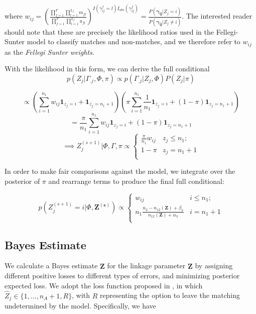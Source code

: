 \documentclass[12pt,letterpaper]{article}
\newcommand{\1}[1]{\mathbb{I}\!\left[#1\right]} %
\begin{document}
where
$w_{ij} = \left(\frac{\prod_{f=1}^{F}\prod_{l=1}^{L_f} m_{fl}}{\prod_{f=1}^{F}\prod_{l=1}^{L_f} u_{fl}}\right)^{I(\gamma_{ij}^f = l)I_{obs}(\gamma_{ij}^f)} = \frac{P(\boldsymbol{\gamma_{ij}}|Z_j = i)}{P(\boldsymbol{\gamma_{ij}} |Z_j \neq i)}$.
The interested reader should note that these are precisely the
likelihood ratios used in the Fellegi-Sunter model to classify matches
and non-matches, and we therefore refer to \(w_{ij}\) as the
\emph{Fellegi Sunter weights}.

With the likelihood in this form, we can derive the full conditional
\[p(Z_j|\Gamma_{.j}, \Phi, \pi) \propto p(\Gamma_{.j}| Z_j, \Phi) P(Z_j|\pi)\]

\[\propto \left(\sum_{i=1}^{n_1}w_{ij}\bm{1}_{z_j = i} + \bm{1}_{z_j = n_1 + 1}\right)\left(\pi\sum_{i=1}^{n_1}\frac{1}{n_1}\bm{1}_{z_j = i} + (1-\pi)\bm{1}_{z_j = n_1 + 1}\right)\]
\[= \frac{\pi}{n_1}\sum_{i=1}^{n_1}w_{ij}\bm{1}_{z_j = i} + (1-\pi)\bm{1}_{z_j = n_1 + 1} \]
\[ \implies Z_j^{(s+1)} | \Phi, \Gamma, \pi \propto
\begin{cases} 
	\frac{\pi}{n_1}w_{ij}   & z_j \leq n_1; \\
	1-\pi &  z_j  = n_1 + 1 \\
\end{cases}\]

In order to make fair comparisons against the \citep{sadinle_bayesian_2017} model, we
integrate over the posterior of \(\pi\) and rearrange terms to
produce the final full conditional:

\[p\left(Z_j^{(s+1)}  = i| \Phi, \bm{Z^{(s)}}\right) \propto
\begin{cases} 
	w_{ij}  & i \leq n_1; \\
	n_1 \frac{n_2 - n_{12}(\bm{Z}) + \beta_{\pi}}{n_{12}(\bm{Z}) + \alpha_{\pi}} & i  = n_1 + 1 \\
\end{cases}\]

\hypertarget{bayes-estimate}{%
	\subsection{Bayes Estimate}
	\label{bayes-estimate}}

We calculate a Bayes estimate \(\hat{\bm{Z}}\) for the linkage
parameter \(\bm{Z}\) by assigning different positive losses to
different types of errors, and minimizing posterior expected loss. We
adopt the loss function proposed in \cite{sadinle_bayesian_2017}, in which
\(\hat{Z}_j \in \{1, \ldots, n_A + 1, R\}\), with \(R\) representing the
option to leave the matching undetermined by the model. Specifically, we have
\end{document}
